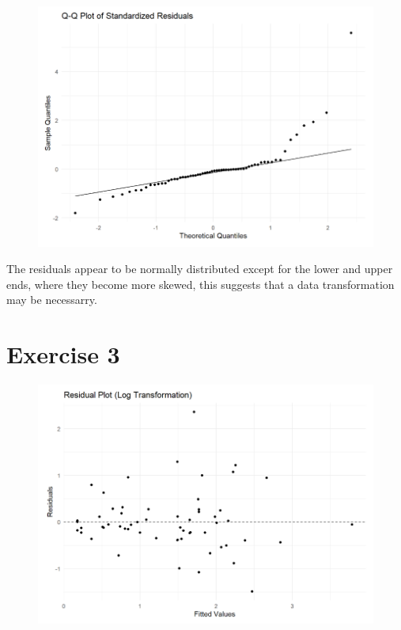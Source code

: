 \documentclass{article}
\begin{document}
\begin{figure}
    \includegraphics[width=\linewidth]{graphs/qq-residuals.png}
\end{figure}

The residuals appear to be normally distributed except for the lower and upper ends, where they become more skewed, this suggests that a data transformation may be necessarry.


\section{Exercise 3}

\begin{figure}
    \includegraphics[width=\linewidth]{graphs/graph-log.png}
\end{figure}
\end{document}
